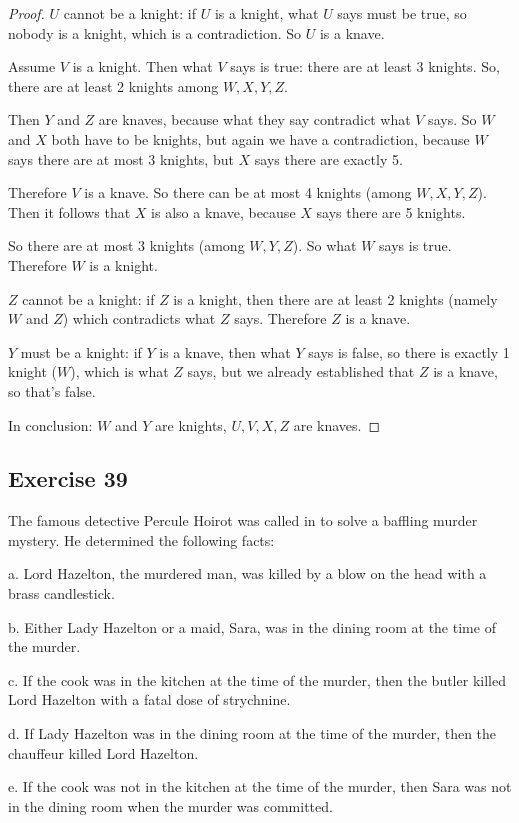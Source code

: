 \documentclass[14pt]{extarticle}
\begin{document}
\begin{proof}
    $U$ cannot be a knight: if $U$ is a knight, what $U$ says must be true, so nobody is a knight, which is a contradiction. So $U$ is a knave.

    Assume $V$ is a knight. Then what $V$ says is true: there are at least 3 knights. So, there are at least 2 knights among $W, X, Y, Z$.

    Then $Y$ and $Z$ are knaves, because what they say contradict what $V$ says. So $W$ and $X$ both have to be knights, but again we have a contradiction, because $W$ says there are at most 3 knights, but $X$ says there are exactly 5.

    Therefore $V$ is a knave. So there can be at most 4 knights (among $W, X, Y, Z$). Then it follows that $X$ is also a knave, because $X$ says there are 5 knights.

    So there are at most 3 knights (among $W, Y, Z$). So what $W$ says is true. Therefore $W$ is a knight.

    $Z$ cannot be a knight: if $Z$ is a knight, then there are at least 2 knights (namely $W$ and $Z$) which contradicts what $Z$ says. Therefore $Z$ is a knave.

    $Y$ must be a knight: if $Y$ is a knave, then what $Y$ says is false, so there is exactly 1 knight ($W$), which is what $Z$ says, but we already established that $Z$ is a knave, so that's false.

    In conclusion: $W$ and $Y$ are knights, $U,V,X,Z$ are knaves. \end{proof}

\subsection{Exercise 39}
The famous detective Percule Hoirot was called in to solve a baffling murder mystery. He determined the following facts:

a. Lord Hazelton, the murdered man, was killed by a blow on the head with a brass candlestick.

b. Either Lady Hazelton or a maid, Sara, was in the dining room at the time of the murder.

c. If the cook was in the kitchen at the time of the murder, then the butler killed Lord Hazelton with a fatal dose of strychnine.

d. If Lady Hazelton was in the dining room at the time of the murder, then the chauffeur killed Lord Hazelton.

e. If the cook was not in the kitchen at the time of the murder, then Sara was not in the dining room when the murder was committed.
\end{document}
